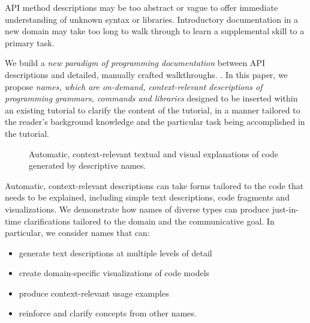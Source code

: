 API method descriptions may be too abstract or vague to offer immediate understanding of unknown syntax or libraries.
Introductory documentation in a new domain may take too long to walk through to learn a supplemental skill to a primary task.

We build a \emph{new paradigm of programming documentation} between API descriptions and detailed, manually crafted walkthroughs.
.
In this paper, we propose \emph{\Glspl{name}, which are on-demand, context-relevant descriptions of programming grammars, commands and libraries} designed to be inserted within an existing tutorial to clarify the content of the tutorial, in a manner tailored to the reader's background knowledge and the particular task being accomplished in the tutorial.

\begin{figure}[!t]
\label{fig:tutorons}
\caption{Automatic, context-relevant textual and visual explanations of code generated by descriptive \glspl{name}.}
\end{figure}

Automatic, context-relevant descriptions can take forms tailored to the code that needs to be explained, including simple text descriptions, code fragments and visualizations. 
We demonstrate how \glspl{name} of diverse types can produce just-in-time clarifications tailored to the domain and the communicative goal.
In particular, we consider \glspl{name} that can:
\begin{itemize} \itemsep1pt
\item generate text descriptions at multiple levels of detail
\item create domain-specific visualizations of code models
\item produce context-relevant usage examples
\item reinforce and clarify concepts from other \glspl{name}.
\end{itemize}

